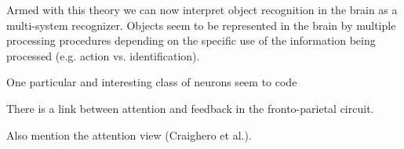 Armed with this theory we can now interpret object recognition in the brain as a multi-system recognizer. Objects seem to be represented in the brain by multiple processing procedures depending on the specific use of the information being processed (e.g. action vs. identification).

One particular and interesting class of neurons seem to code 

There is a link between attention and feedback in the fronto-parietal circuit.

Also mention the attention view (Craighero et al.).


